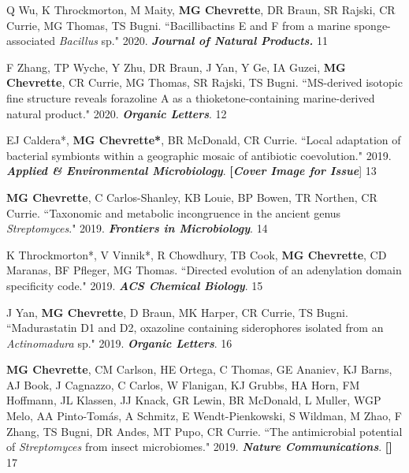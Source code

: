\begin{cvpubs}
\cvpub
{Q Wu, K Throckmorton, M Maity, \textbf{MG Chevrette}, DR Braun, SR Rajski, CR Currie, MG Thomas, TS Bugni. ``Bacillibactins E and F from a marine sponge-associated \textit{Bacillus} sp." 2020. \textbf{\textit{Journal of Natural Products.}} \textbf{\textit{}}}
{11}

\cvpub
{F Zhang, TP Wyche, Y Zhu, DR Braun, J Yan, Y Ge, IA Guzei, \textbf{MG Chevrette}, CR Currie, MG Thomas, SR Rajski, TS Bugni. ``MS-derived isotopic fine structure reveals forazoline A as a thioketone-containing marine-derived natural product." 2020. \textit{\textbf{Organic Letters}}. \textbf{\textit{}}}
{12}

\cvpub
{EJ Caldera*, \textbf{MG Chevrette*}, BR McDonald, CR Currie. ``Local adaptation of bacterial symbionts within a geographic mosaic of antibiotic coevolution." 2019. \textit{\textbf{Applied \& Environmental Microbiology}}. \textbf{\textit{}} \textbf{[\textit{Cover Image for Issue}}]}
{13}

\cvpub
{\textbf{MG Chevrette}, C Carlos-Shanley, KB Louie, BP Bowen, TR Northen, CR Currie. ``Taxonomic and metabolic incongruence in the ancient genus \textit{Streptomyces}." 2019. \textit{\textbf{Frontiers in Microbiology}}. \textbf{\textit{}}}
{14}

\cvpub
{K Throckmorton*, V Vinnik*, R Chowdhury, TB Cook, \textbf{MG Chevrette}, CD Maranas, BF Pfleger, MG Thomas. ``Directed evolution of an adenylation domain specificity code." 2019. \textit{\textbf{ACS Chemical Biology}}. \textbf{\textit{}}}
{15}

\cvpub
{J Yan, \textbf{MG Chevrette}, D Braun, MK Harper, CR Currie, TS Bugni. ``Madurastatin D1 and D2, oxazoline containing siderophores isolated from an \textit{Actinomadura} sp." 2019. \textit{\textbf{Organic Letters}}. \textbf{\textit{}}}
{16}

\cvpub
{\textbf{MG Chevrette}, CM Carlson, HE Ortega, C Thomas, GE Ananiev, KJ Barns, AJ Book, J Cagnazzo, C Carlos, W Flanigan, KJ Grubbs, HA Horn, FM Hoffmann, JL Klassen, JJ Knack, GR Lewin, BR McDonald, L Muller, WGP Melo, AA Pinto-Tom\'{a}s, A Schmitz, E Wendt-Pienkowski, S Wildman, M Zhao, F Zhang, TS Bugni, DR Andes, MT Pupo, CR Currie. ``The antimicrobial potential of \textit{Streptomyces} from insect microbiomes." 2019. \textit{\textbf{Nature Communications}}. \textbf{\textit{}} \linebreak \textbf{[\textit{}]}}
{17}


\end{cvpubs}
